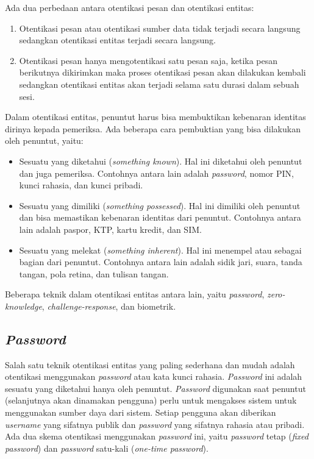 Ada dua perbedaan antara otentikasi pesan dan otentikasi entitas:
\begin{enumerate}
	\item Otentikasi pesan atau otentikasi sumber data tidak terjadi secara langsung sedangkan otentikasi entitas terjadi secara langsung.
	\item Otentikasi pesan hanya mengotentikasi satu pesan saja, ketika pesan berikutnya dikirimkan maka proses otentikasi pesan akan dilakukan kembali sedangkan otentikasi entitas akan terjadi selama satu durasi dalam sebuah sesi.
\end{enumerate}

Dalam otentikasi entitas, penuntut harus bisa membuktikan kebenaran identitas dirinya kepada pemeriksa. Ada beberapa cara pembuktian yang bisa dilakukan oleh penuntut, yaitu:
\begin{itemize}
	\item Sesuatu yang diketahui (\textit{something known}). Hal ini diketahui oleh penuntut dan juga pemeriksa. Contohnya antara lain adalah \textit{password}, nomor PIN, kunci rahasia, dan kunci pribadi.
	\item Sesuatu yang dimiliki (\textit{something possessed}). Hal ini dimiliki oleh penuntut dan bisa memastikan kebenaran identitas dari penuntut. Contohnya antara lain adalah paspor, KTP, kartu kredit, dan SIM.
	\item Sesuatu yang melekat (\textit{something inherent}). Hal ini menempel atau sebagai bagian dari penuntut. Contohnya antara lain adalah sidik jari, suara, tanda tangan, pola retina, dan tulisan tangan.
\end{itemize}

\begin{flushleft}
	Beberapa teknik dalam otentikasi entitas antara lain, yaitu \textit{password}, \textit{zero-knowledge}, \textit{challenge-response}, dan biometrik.
\end{flushleft}

\subsection{\textit{Password}}
Salah satu teknik otentikasi entitas yang paling sederhana dan mudah adalah otentikasi menggunakan \textit{password} atau kata kunci rahasia. \textit{Password} ini adalah sesuatu yang diketahui hanya oleh penuntut. \textit{Password} digunakan saat penuntut (selanjutnya akan dinamakan pengguna) perlu untuk mengakses sistem untuk menggunakan sumber daya dari sistem. Setiap pengguna akan diberikan \textit{username} yang sifatnya publik dan \textit{password} yang sifatnya rahasia atau pribadi. Ada dua skema otentikasi menggunakan \textit{password} ini, yaitu \textit{password} tetap (\textit{fixed password}) dan \textit{password} satu-kali (\textit{one-time password}).

